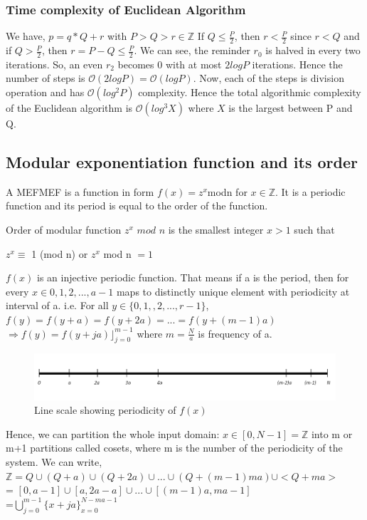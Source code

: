\subsubsection{Time complexity of Euclidean Algorithm}
We have, $ p = q*Q + r$ with  $P > Q > r\in \mathbb{Z} $ \linebreak
If $Q \leq \frac{P}{2}$, then $r < \frac{P}{2}$ since $r < Q$ and if $Q > \frac{P}{2}$, then $r = P - Q \leq \frac{P}{2}$. \linebreak
We can see, the reminder $r_0$ is halved in every two iterations. So, an even $r_2$ becomes 0 with at most $2logP$ iterations. Hence the number of steps is $\mathcal{O}(2logP) = \mathcal{O}(log P)$. Now, each of the steps is division operation and has $\mathcal{O}(log^2 P)$ complexity. Hence the total algorithmic complexity of the Euclidean algorithm is $\mathcal{O}(log^3 X)$ where $X$ is the largest between P and Q.

\subsection{Modular exponentiation function and its order} \label{sbsec: MEF}
A \acrlong{MEF}\acrshort{MEF} is a function in form $f(x) = z^x  $mod$  $n$  $ for $x \in \mathbb{Z}$. It is a periodic function and its period is equal to the order of the function.
\begin{definition}
    Order of  modular function $z^x$ $mod$ $n$ is the smallest integer $x > 1$ such that 
    \begin{center}
         $z^x \equiv$ 1 (mod n)  or  $z^x$ mod n $= 1$
    \end{center}
\end{definition}

$f(x)$ is an injective periodic function.\cite{loceff2015} That means if a is the period, then for every $x \in {0, 1, 2, . . ., a-1}$ maps to distinctly unique element with periodicity at interval of a. i.e. For all $ y \in \{0, 1,,2, . . ., r-1\}$, $f(y) = f(y + a) = f(y + 2a) = . . . = f(y + (m-1)a)$
$\Rightarrow f(y) = f(y + ja) \rfloor_{j=0} ^{m-1} $ where $m = \frac{N}{a}$ is frequency of a.

\begin{figure}[H]
\centering
\includegraphics[scale=0.6]{figures/period_line.PNG}
\caption{Line scale showing periodicity of $f(x)$}
\label{fig: Period_a}
\end{figure}
Hence, we can partition the whole input domain: $x \in [0, N-1]= \mathbb{Z}$ into m or m+1 partitions called cosets, where m is the number of the periodicity of the system. We can write,
 \\ $\mathbb{Z} = Q \cup (Q+a) \cup (Q+2a) \cup . . . \cup (Q+(m-1)ma) \cup <Q+ma>$
\\ = $[0,a-1] \cup [a,2a -a] \cup . . . \cup [(m-1)a,ma-1]$
\\ =$\bigcup_{j=0}^{m-1}\{x + ja\}_{x=0}^{N-ma-1}$


